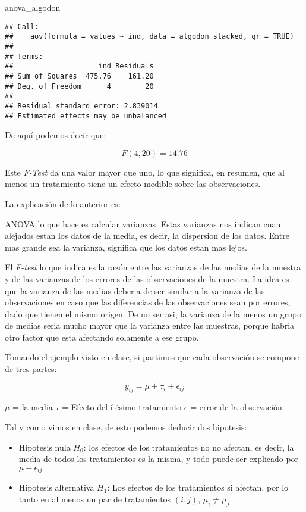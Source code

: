 \documentclass[]{article}
\newenvironment{Shaded}{\begin{snugshade}}{\end{snugshade}}
\newcommand{\NormalTok}[1]{#1}
\providecommand{\tightlist}{%
  \setlength{\itemsep}{0pt}\setlength{\parskip}{0pt}}
\begin{document}
\begin{Shaded}
\begin{Highlighting}[]
\NormalTok{anova_algodon}
\end{Highlighting}
\end{Shaded}

\begin{verbatim}
## Call:
##    aov(formula = values ~ ind, data = algodon_stacked, qr = TRUE)
## 
## Terms:
##                    ind Residuals
## Sum of Squares  475.76    161.20
## Deg. of Freedom      4        20
## 
## Residual standard error: 2.839014
## Estimated effects may be unbalanced
\end{verbatim}

De aquí podemos decir que:

\[F(4,20)=14.76\]

Este \emph{F-Test} da una valor mayor que uno, lo que significa, en
resumen, que al menos un tratamiento tiene un efecto medible sobre las
observaciones.

La explicación de lo anterior es:

ANOVA lo que hace es calcular varianzas. Estas varianzas nos indican
cuan alejados estan los datos de la media, es decir, la dispersion de
los datos. Entre mas grande sea la varianza, significa que los datos
estan mas lejos.

El \emph{F-test} lo que indica es la razón entre las varianzas de las
medias de la muestra y de las varianzas de los errores de las
observaciones de la muestra. La idea es que la varianza de las medias
deberia de ser similar a la varianza de las observaciones en caso que
las diferencias de las observaciones sean por errores, dado que tienen
el mismo origen. De no ser asi, la varianza de la menos un grupo de
medias seria mucho mayor que la varianza entre las muestras, porque
habria otro factor que esta afectando solamente a ese grupo.

Tomando el ejemplo visto en clase, si partimos que cada observación se
compone de tres partes:

\[ y_{ij} = \mu + \tau_i + \epsilon_{ij} \]

\(\mu\) = la media \(\tau\) = Efecto del í-ésimo tratamiento
\(\epsilon\) = error de la observación

Tal y como vimos en clase, de esto podemos deducir dos hipotesis:

\begin{itemize}
\tightlist
\item
  Hipotesis nula \(H_0\): los efectos de los tratamientos no no afectan,
  es decir, la media de todos los tratamientos es la misma, y todo puede
  ser explicado por \(\mu + \epsilon_{ij}\)
\item
  Hipotesis alternativa \(H_1\): Los efectos de los tratamientos si
  afectan, por lo tanto en al menos un par de tratamientos \((i,j)\),
  \(\mu_i \neq \mu_j\)
\end{itemize}
\end{document}
